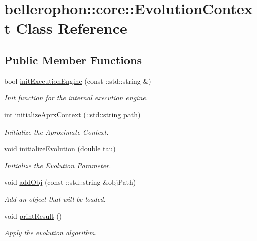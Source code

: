 \hypertarget{classbellerophon_1_1core_1_1EvolutionContext}{}\section{bellerophon\+:\+:core\+:\+:Evolution\+Context Class Reference}
\label{classbellerophon_1_1core_1_1EvolutionContext}
\subsection*{Public Member Functions}
\begin{DoxyCompactItemize}
\item 
bool \hyperlink{classbellerophon_1_1core_1_1EvolutionContext_aab5413234e99512ab0208539cf866a8a}{init\+Execution\+Engine} (const \+::std\+::string \&)
\begin{DoxyCompactList}\small\item\em Init function for the internal execution engine. \end{DoxyCompactList}\item 
int \hyperlink{classbellerophon_1_1core_1_1EvolutionContext_a13906d3491e042f84473f0b10283acdd}{initialize\+Aprx\+Context} (\+::std\+::string path)
\begin{DoxyCompactList}\small\item\em Initialize the Aproximate Context. \end{DoxyCompactList}\item 
void \hyperlink{classbellerophon_1_1core_1_1EvolutionContext_ad21ec88b2a31a98140b052dcb0352cc9}{initialize\+Evolution} (double tau)
\begin{DoxyCompactList}\small\item\em Initialize the Evolution Parameter. \end{DoxyCompactList}\item 
void \hyperlink{classbellerophon_1_1core_1_1EvolutionContext_a8ec4af08d2fa630cd1a6daa4e6400cc4}{add\+Obj} (const \+::std\+::string \&obj\+Path)
\begin{DoxyCompactList}\small\item\em Add an object that will be loaded. \end{DoxyCompactList}\item 
void \hyperlink{classbellerophon_1_1core_1_1EvolutionContext_aa100267fe3f388b794dfeb6d1c105c89}{print\+Result} ()
\begin{DoxyCompactList}\small\item\em Apply the evolution algorithm. \end{DoxyCompactList}\item 

\end{DoxyCompactItemize}
